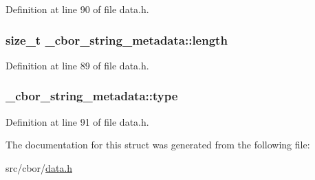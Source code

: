 Definition at line 90 of file data.\-h.

\hypertarget{struct__cbor__string__metadata_a558805df7c655cfaf3c289bc536ff96e}{
\subsubsection[{length}]{\setlength{\rightskip}{0pt plus 5cm}size\-\_\-t \-\_\-cbor\-\_\-string\-\_\-metadata\-::length}}\label{struct__cbor__string__metadata_a558805df7c655cfaf3c289bc536ff96e}


Definition at line 89 of file data.\-h.

\hypertarget{struct__cbor__string__metadata_afcfdf5e250b677a7e88c5b9c1919bc1a}{
\subsubsection[{type}]{ \-\_\-cbor\-\_\-string\-\_\-metadata\-::type}}\label{struct__cbor__string__metadata_afcfdf5e250b677a7e88c5b9c1919bc1a}


Definition at line 91 of file data.\-h.



The documentation for this struct was generated from the following file\-:\begin{DoxyCompactItemize}
\item 
src/cbor/\hyperlink{data_8h}{data.\-h}\end{DoxyCompactItemize}
